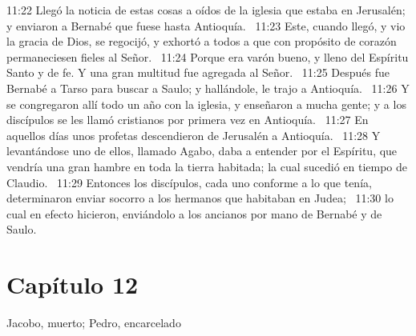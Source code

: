 11:22 Llegó la noticia de estas cosas a oídos de la iglesia que estaba en Jerusalén; y enviaron a Bernabé que fuese hasta Antioquía.  
11:23 Este, cuando llegó, y vio la gracia de Dios, se regocijó, y exhortó a todos a que con propósito de corazón permaneciesen fieles al Señor.  
11:24 Porque era varón bueno, y lleno del Espíritu Santo y de fe. Y una gran multitud fue agregada al Señor.  
11:25 Después fue Bernabé a Tarso para buscar a Saulo; y hallándole, le trajo a Antioquía.  
11:26 Y se congregaron allí todo un año con la iglesia, y enseñaron a mucha gente; y a los discípulos se les llamó cristianos por primera vez en Antioquía.  
11:27 En aquellos días unos profetas descendieron de Jerusalén a Antioquía.  
11:28 Y levantándose uno de ellos, llamado Agabo, daba a entender por el Espíritu, que vendría una gran hambre en toda la tierra habitada; la cual sucedió en tiempo de Claudio.  
11:29 Entonces los discípulos, cada uno conforme a lo que tenía, determinaron enviar socorro a los hermanos que habitaban en Judea;  
11:30 lo cual en efecto hicieron, enviándolo a los ancianos por mano de Bernabé y de Saulo.  
\section*{Capítulo 12}
Jacobo, muerto; Pedro, encarcelado  

